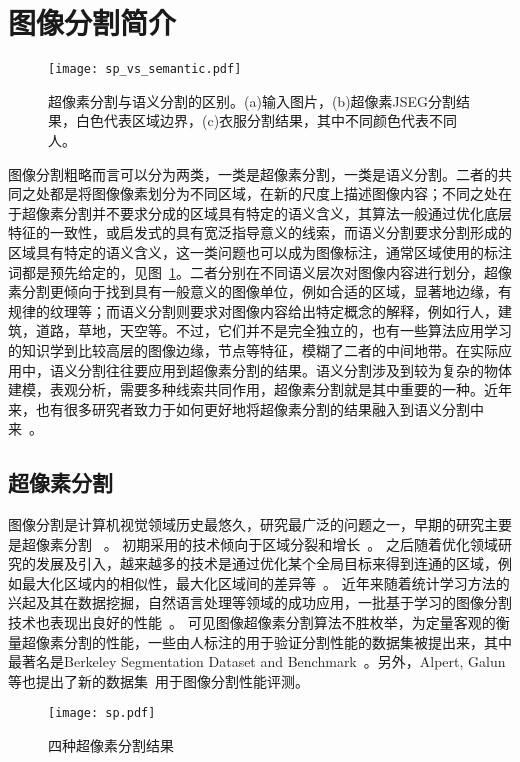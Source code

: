 \section{图像分割简介}
\begin{figure}[t]
  \centering
  \texttt{[image: sp\_vs\_semantic.pdf]}
  \caption{超像素分割与语义分割的区别。(a)输入图片\cite{lfw}，(b)超像素JSEG\cite{jseg}分割结果，白色代表区域边界，(c)衣服分割结果\cite{whoblockswho}，其中不同颜色代表不同人。}
  \label{fig:sp_vs_semantic}
\end{figure}
图像分割粗略而言可以分为两类，一类是超像素分割，一类是语义分割。二者的共同之处都是将图像像素划分为不同区域，在新的尺度上描述图像内容；不同之处在于超像素分割并不要求分成的区域具有特定的语义含义，其算法一般通过优化底层特征的一致性，或启发式的具有宽泛指导意义的线索，而语义分割要求分割形成的区域具有特定的语义含义，这一类问题也可以成为图像标注，通常区域使用的标注词都是预先给定的，见图~\ref{fig:sp_vs_semantic}。二者分别在不同语义层次对图像内容进行划分，超像素分割更倾向于找到具有一般意义的图像单位，例如合适的区域，显著地边缘，有规律的纹理等；而语义分割则要求对图像内容给出特定概念的解释，例如行人，建筑，道路，草地，天空等。不过，它们并不是完全独立的，也有一些算法应用学习的知识学到比较高层的图像边缘，节点等特征，模糊了二者的中间地带。在实际应用中，语义分割往往要应用到超像素分割的结果。语义分割涉及到较为复杂的物体建模，表观分析，需要多种线索共同作用，超像素分割就是其中重要的一种。近年来，也有很多研究者致力于如何更好地将超像素分割的结果融入到语义分割中来~\cite{robustpn}\cite{hierarchicalcrf}\cite{dualdecomp}\cite{sparsehighorder}\cite{exacthighorder}。

\subsection{超像素分割}
图像分割是计算机视觉领域历史最悠久，研究最广泛的问题之一，早期的研究主要是超像素分割 ~\cite{brice1970scene}\cite{pavlidis1977structural}\cite{riseman1977computational}\cite{ohlander1978picture}\cite{rosenfeld1979image}\cite{haralick1985image}。 初期采用的技术倾向于区域分裂和增长~\cite{brice1970scene}\cite{horowitz1976picture}\cite{ohlander1978picture}\cite{pavlidis1990integrating}\cite{jseg}。 之后随着优化领域研究的发展及引入，越来越多的技术是通过优化某个全局目标来得到连通的区域，例如最大化区域内的相似性，最大化区域间的差异等~\cite{leclerc1989constructing}\cite{mumford1985boundary}\cite{ncut}\cite{meanshift}\cite{graphseg}\cite{levelset}。 近年来随着统计学习方法的兴起及其在数据挖掘，自然语言处理等领域的成功应用，一批基于学习的图像分割技术也表现出良好的性能~\cite{ren2008multi}\cite{xiaofeng2012discriminatively}\cite{dollar2006supervised}\cite{hariharan2011semantic}。 可见图像超像素分割算法不胜枚举，为定量客观的衡量超像素分割的性能，一些由人标注的用于验证分割性能的数据集被提出来，其中最著名是Berkeley Segmentation Dataset and Benchmark~\cite{berkeleyseg}。另外，Alpert, Galun等也提出了新的数据集~\cite{alpert2007image}用于图像分割性能评测。
\begin{figure}[H]
  \centering
  \texttt{[image: sp.pdf]}
  \caption{四种超像素分割结果}
  \label{fig:sp}
\end{figure}

